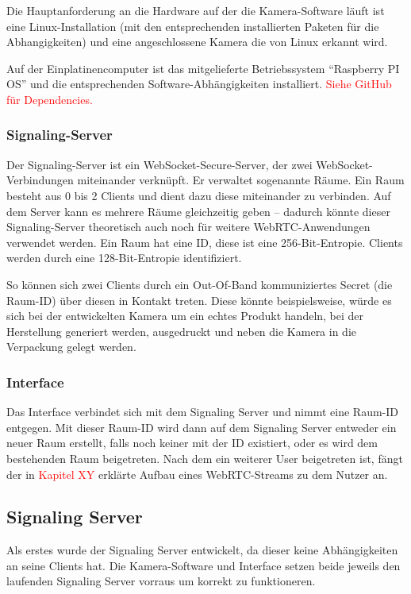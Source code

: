\documentclass{article}
\begin{document}
\begin{onecolumn}
Die Hauptanforderung an die Hardware auf der die Kamera-Software läuft ist eine
Linux-Installation (mit den entsprechenden installierten Paketen für die
Abhangigkeiten) und eine angeschlossene Kamera die von Linux erkannt wird.

Auf der Einplatinencomputer ist das mitgelieferte Betriebssystem ``Raspberry PI
OS'' und die entsprechenden Software-Abhängigkeiten installiert. 
\textcolor{red}{Siehe GitHub für Dependencies.}

\subsubsection{Signaling-Server}

Der Signaling-Server ist ein WebSocket-Secure-Server, der zwei
WebSocket-Verbindungen miteinander verknüpft. Er verwaltet sogenannte Räume.
Ein Raum besteht aus 0 bis 2 Clients und dient dazu diese miteinander zu
verbinden. Auf dem Server kann es mehrere Räume gleichzeitig geben – dadurch
könnte dieser Signaling-Server theoretisch auch noch für weitere
WebRTC-Anwendungen verwendet werden. Ein Raum hat eine ID, diese ist eine
256-Bit-Entropie. Clients werden durch eine 128-Bit-Entropie identifiziert.

So können sich zwei Clients durch ein Out-Of-Band kommuniziertes Secret (die
Raum-ID) über diesen in Kontakt treten. Diese könnte beispielsweise, würde es
sich bei der entwickelten Kamera um ein echtes Produkt handeln, bei der
Herstellung generiert werden, ausgedruckt und neben die Kamera in die
Verpackung gelegt werden.

\subsubsection{Interface}

Das Interface verbindet sich mit dem Signaling Server und nimmt eine Raum-ID
entgegen. Mit dieser Raum-ID wird dann auf dem Signaling Server entweder ein
neuer Raum erstellt, falls noch keiner mit der ID existiert, oder es wird dem
bestehenden Raum beigetreten. Nach dem ein weiterer User beigetreten ist, fängt
der in \textcolor{red}{Kapitel XY} erklärte Aufbau eines WebRTC-Streams zu dem
Nutzer an.

\subsection{Signaling Server}

Als erstes wurde der Signaling Server entwickelt, da dieser keine
Abhängigkeiten an seine Clients hat. Die Kamera-Software und Interface setzen
beide jeweils den laufenden Signaling Server vorraus um korrekt zu
funktioneren.


\end{onecolumn}
\end{document}
